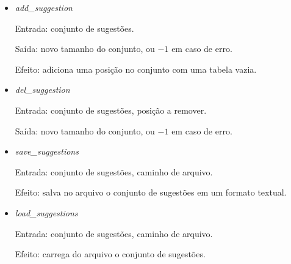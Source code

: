 \begin{itemize}
  \item \textit{add_suggestion}
    \par Entrada: conjunto de sugestões.
    \par Saída: novo tamanho do conjunto, ou $-1$ em caso de erro.
    \par Efeito: adiciona uma posição no conjunto com uma tabela vazia.
  \item \textit{del_suggestion}
    \par Entrada: conjunto de sugestões, posição a remover.
    \par Saída: novo tamanho do conjunto, ou $-1$ em caso de erro.
  \item \textit{save_suggestions}
    \par Entrada: conjunto de sugestões, caminho de arquivo.
    \par Efeito: salva no arquivo o conjunto de sugestões em um formato textual.
  \item \textit{load_suggestions}
    \par Entrada: conjunto de sugestões, caminho de arquivo.
    \par Efeito: carrega do arquivo o conjunto de sugestões.
\end{itemize}

%
%
%
%
%
%
%
%
%
%

